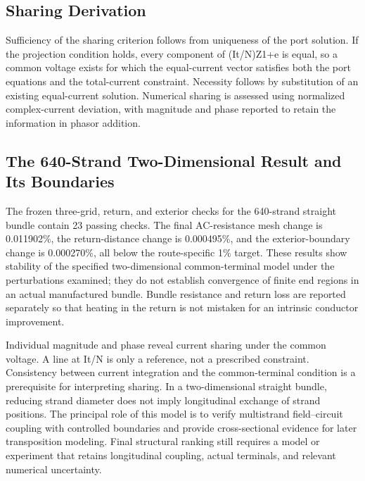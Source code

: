 \documentclass[11pt]{article}
\begin{document}
\subsection*{Sharing Derivation}
\hypertarget{04.sharing_derivation.heading}{}
Sufficiency of the sharing criterion follows from uniqueness of the port solution. If the projection condition holds, every component of (It/N)Z1+e is equal, so a common voltage exists for which the equal-current vector satisfies both the port equations and the total-current constraint. Necessity follows by substitution of an existing equal-current solution. Numerical sharing is assessed using normalized complex-current deviation, with magnitude and phase reported to retain the information in phasor addition.


\subsection*{The 640-Strand Two-Dimensional Result and Its Boundaries}
\hypertarget{04.coax_results.heading}{}
The frozen three-grid, return, and exterior checks for the 640-strand straight bundle contain 23 passing checks. The final AC-resistance mesh change is 0.011902\%, the return-distance change is 0.000495\%, and the exterior-boundary change is 0.000270\%, all below the route-specific 1\% target. These results show stability of the specified two-dimensional common-terminal model under the perturbations examined; they do not establish convergence of finite end regions in an actual manufactured bundle. Bundle resistance and return loss are reported separately so that heating in the return is not mistaken for an intrinsic conductor improvement.


Individual magnitude and phase reveal current sharing under the common voltage. A line at It/N is only a reference, not a prescribed constraint. Consistency between current integration and the common-terminal condition is a prerequisite for interpreting sharing. In a two-dimensional straight bundle, reducing strand diameter does not imply longitudinal exchange of strand positions. The principal role of this model is to verify multistrand field–circuit coupling with controlled boundaries and provide cross-sectional evidence for later transposition modeling. Final structural ranking still requires a model or experiment that retains longitudinal coupling, actual terminals, and relevant numerical uncertainty.
\end{document}
